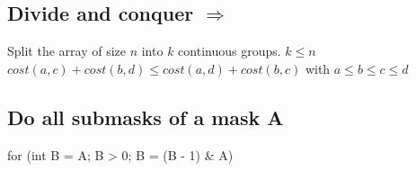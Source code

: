 \subsection{Divide and conquer  $\Rightarrow$  } 
Split the array of size $n$ into $k$ continuous groups. $k \leq n$ \\
$cost(a, c) + cost(b, d) \leq cost(a, d) + cost(b, c)$ with $a \leq b \leq c \leq d$ \\

\subsection{Do all submasks of a mask A}
\begin{code}
for (int B = A; B > 0; B = (B - 1) & A)
\end{code}

